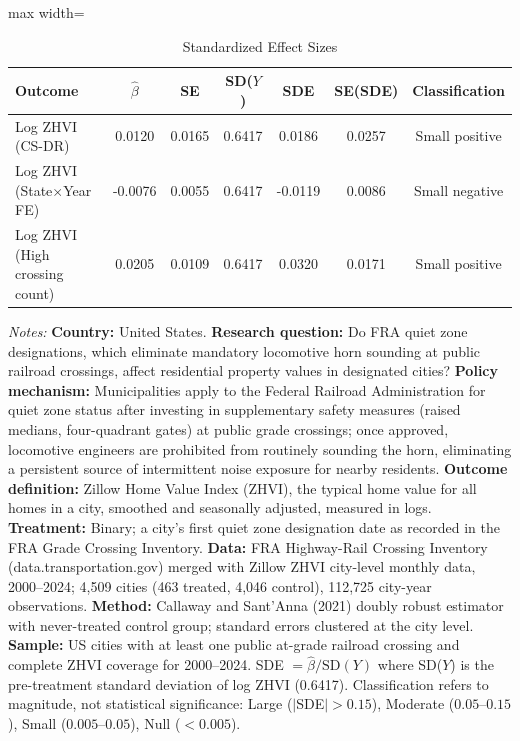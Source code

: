 \begin{table}[t]
\centering
\caption{Standardized Effect Sizes}
\label{tab:sde}
\begin{adjustbox}{max width=\textwidth}
\begin{tabular}{lcccccc}
\hline\hline
Outcome & $\hat{\beta}$ & SE & SD($Y$) & SDE & SE(SDE) & Classification \\
\hline
Log ZHVI (CS-DR) & 0.0120 & 0.0165 & 0.6417 & 0.0186 & 0.0257 & Small positive \\
Log ZHVI (State$\times$Year FE) & -0.0076 & 0.0055 & 0.6417 & -0.0119 & 0.0086 & Small negative \\
Log ZHVI (High crossing count) & 0.0205 & 0.0109 & 0.6417 & 0.0320 & 0.0171 & Small positive \\
\hline\hline
\end{tabular}
\end{adjustbox}
\par\vspace{0.3em}
{\footnotesize
\textit{Notes:} \textbf{Country:} United States. \textbf{Research question:} Do FRA quiet zone designations, which eliminate mandatory locomotive horn sounding at public railroad crossings, affect residential property values in designated cities? \textbf{Policy mechanism:} Municipalities apply to the Federal Railroad Administration for quiet zone status after investing in supplementary safety measures (raised medians, four-quadrant gates) at public grade crossings; once approved, locomotive engineers are prohibited from routinely sounding the horn, eliminating a persistent source of intermittent noise exposure for nearby residents. \textbf{Outcome definition:} Zillow Home Value Index (ZHVI), the typical home value for all homes in a city, smoothed and seasonally adjusted, measured in logs. \textbf{Treatment:} Binary; a city's first quiet zone designation date as recorded in the FRA Grade Crossing Inventory. \textbf{Data:} FRA Highway-Rail Crossing Inventory (data.transportation.gov) merged with Zillow ZHVI city-level monthly data, 2000--2024; 4,509 cities (463 treated, 4,046 control), 112,725 city-year observations. \textbf{Method:} Callaway and Sant'Anna (2021) doubly robust estimator with never-treated control group; standard errors clustered at the city level. \textbf{Sample:} US cities with at least one public at-grade railroad crossing and complete ZHVI coverage for 2000--2024. SDE $= \hat{\beta} / \text{SD}(Y)$ where SD($Y$) is the pre-treatment standard deviation of log ZHVI (0.6417). Classification refers to magnitude, not statistical significance: Large ($|$SDE$| > 0.15$), Moderate ($0.05$--$0.15$), Small ($0.005$--$0.05$), Null ($< 0.005$).
}
\end{table}

